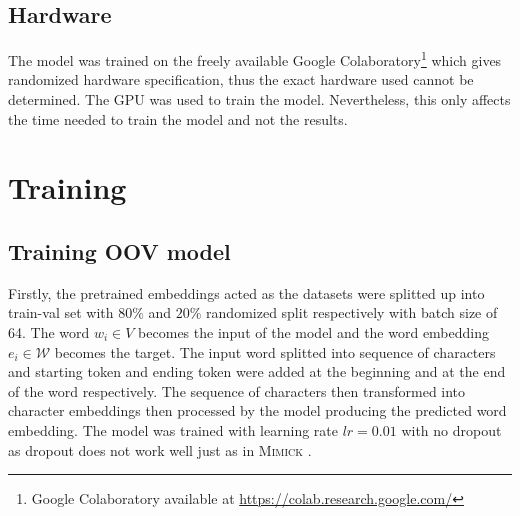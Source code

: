     \subsection{Hardware}
        The model was trained on the freely available Google
        Colaboratory\footnote{Google Colaboratory available at
        \url{https://colab.research.google.com/}} which gives
        randomized hardware specification, thus the exact hardware
        used cannot be determined. The GPU was used to train the
        model. Nevertheless, this only affects the time needed to
        train the model and not the results.

\section{Training}
    \subsection{Training OOV model}
        Firstly, the pretrained embeddings acted as the datasets were
        splitted up into train-val set with $80\%$ and $20\%$
        randomized split respectively with batch size of 64. The word
        $w_i \in V$ becomes the input of the model and the word
        embedding $e_i \in \mathcal{W}$ becomes the target. The input
        word splitted into sequence of characters and starting token
        and ending token were added at the beginning and at the end of
        the word respectively. 
        The sequence of characters then transformed into character
        embeddings then processed by the model producing the predicted
        word embedding. The model was trained with learning rate $lr =
        0.01$ with no dropout as dropout does not work well just as in
        \textsc{Mimick} \citep{mimicking2017Pinter}.
